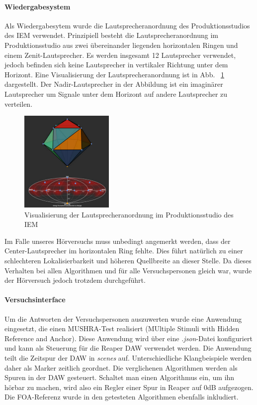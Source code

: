 \paragraph{Wiedergabesystem}
Als Wiedergabesytem wurde die Lautsprecheranordnung des Produktionsstudios des IEM verwendet. Prinzipiell besteht die Lautsprecheranordnung im Produktionsstudio aus zwei übereinander liegenden horizontalen Ringen und einem Zenit-Lautsprecher. Es werden insgesamt 12 Lautsprecher verwendet, jedoch befinden sich keine Lautsprecher in vertikaler Richtung unter dem Horizont. Eine Visualisierung der Lautsprecheranordnung ist in Abb. ~\ref{fig:aufb:prodstud} dargestellt. Der Nadir-Lautsprecher in der Abbildung ist ein imaginärer Lautsprecher um Signale unter dem Horizont auf andere Lautsprecher zu verteilen.

\begin{figure}[!ht]
  \centering
  \includegraphics[width=0.4\textwidth]{aufbau/plots/speaker_pos_prod_studio.png}
  \caption{Visualisierung der Lautsprecheranordnung im Produktionsstudio des IEM \protect\footnotemark}
  \label{fig:aufb:prodstud}
\end{figure}


Im Falle unseres Hörversuchs muss unbedingt angemerkt werden, dass der Center-Lautsprecher im horizontalen Ring fehlte. Dies führt natürlich zu einer schlechteren Lokalisierbarkeit und höheren Quellbreite an dieser Stelle. Da dieses Verhalten bei allen Algorithmen und für alle Versuchspersonen gleich war, wurde der Hörversuch jedoch trotzdem durchgeführt.

\paragraph{Versuchsinterface}
Um die Antworten der Versuchspersonen auszuwerten wurde eine Anwendung eingesetzt, die einen MUSHRA-Test realisiert (MUltiple Stimuli with Hidden Reference and Anchor). Diese Anwendung wird über eine \textit{.json}-Datei konfiguriert und kann als Steuerung für die Reaper DAW verwendet werden. Die Anwendung teilt die Zeitspur der DAW in \textit{scenes} auf. Unterschiedliche Klangbeispiele werden daher als Marker zeitlich geordnet. Die verglichenen Algorithmen werden als Spuren in der DAW gesteuert. Schaltet man einen Algorithmus ein, um ihn hörbar zu machen, wird also ein Regler einer Spur in Reaper auf 0dB aufgezogen. Die FOA-Referenz wurde in den getesteten Algorithmen ebenfalls inkludiert.

